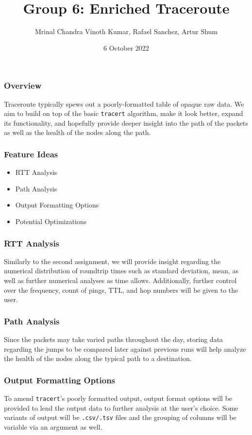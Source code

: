 \documentclass{beamer}
\title{Group 6: Enriched Traceroute}
\author{Mrinal Chandra Vinoth Kumar, Rafael Sanchez, Artur Shum}
\institute{Stevens Institute of Technology}
\date{6 October 2022}
\begin{document}
\frame{\titlepage}

\begin{frame}
\frametitle{Overview}

Traceroute typically spews out a poorly-formatted table of 
opaque raw data. We aim to build on top of the basic \texttt{tracert} algorithm,
make it look better, expand its functionality, and hopefully provide deeper insight
into the path of the packets as well as the health of the nodes along the path.

\end{frame}

\begin{frame}
\frametitle{Feature Ideas}
\begin{itemize}
  \item RTT Analysis
  \item Path Analysis
  \item Output Formatting Options
  \item Potential Optimizations
\end{itemize}
\end{frame}

\begin{frame}
\frametitle{RTT Analysis}

Similarly to the second assignment, we will provide insight regarding
the numerical distribution of roundtrip times such as standard deviation,
mean, as well as further numerical analyses as time allows. Additionally,
further control over the frequency, count of pings, TTL, and hop numbers
will be given to the user.

\end{frame}

\begin{frame}
\frametitle{Path Analysis}

Since the packets may take varied paths throughout the day, storing data regarding
the jumps to be compared later against previous runs will help analyze the health
of the nodes along the typical path to a destination. 

\end{frame}

\begin{frame}

\frametitle{Output Formatting Options}

To amend \texttt{tracert}'s poorly formatted output, output format options 
will be provided to lend the output data to further analysis at the user's choice.
Some variants of output will be \texttt{.csv/.tsv} files and the 
grouping of columns will be variable via an argument as well.

\end{frame}
\end{document}
